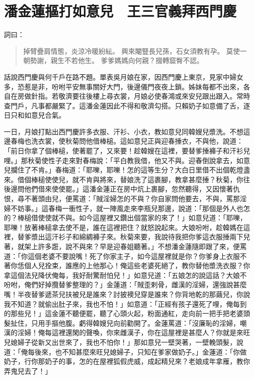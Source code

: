 
\chapter{潘金蓮摳打如意兒　王三官義拜西門慶}

詞曰：
\begin{quote}
掉臂疊肩情態，炎涼冷暖紛紜。
興來閹豎長兒孫，石女須教有孕。
莫使一朝勢謝，親生不若他生。
爹爹媽媽向何親？掇轉窟臀不認。
\end{quote}

話說西門慶與何千戶在路不題。單表吳月娘在家，因西門慶上東京，見家中婦女多，恐惹是非，吩咐平安無事關好大門，後邊儀門夜夜上鎖。姊妹每都不出來，各自在房做針指。若敬濟要往後樓上尋衣裳，月娘必使春鴻或來安兒跟出跟入。常時查門戶，凡事都嚴緊了。這潘金蓮因此不得和敬濟勾搭。只賴奶子如意備了舌，逐日只和如意兒合氣。

一日，月娘打點出西門慶許多衣服、汗衫、小衣，教如意兒同韓嫂兒漿洗。不想這邊春梅也洗衣裳，使秋菊問他借棒槌。這如意兒正與迎春捶衣，不與他，說道：「前日你拿了個棒槌，使著罷了，又來要！趁韓嫂在這裡，要替爹捶褲子和汗衫兒哩。」那秋菊使性子走來對春梅說：「平白教我借，他又不與。迎春倒說拿去，如意兒攔住了不肯。」春梅道：「耶嚛，耶嚛！怎的這等生分？大白日里借不出個乾燈盞來。借個棒槌使使兒，就不肯與將來，替娘洗了這裹腳，教拿甚麼捶？秋菊，你往後邊問他們借來使使罷。」這潘金蓮正在房中炕上裹腳，忽然聽得，又因懷著仇恨，尋不著頭由兒，便罵道：「賊淫婦怎的不與？你自家問他要去，不與，罵那淫婦不妨事。」這春梅一衝性子，就一陣風走來李瓶兒那邊，說道：「那個是外人也怎的？棒槌借使使就不與。如今這屋裡又鑽出個當家的來了！」如意兒道：「耶嚛，耶嚛！放著棒槌拿去使不是，誰在這裡把住？就怒說起來。大娘吩咐，趁韓媽在這裡，替爹漿出這汗衫子和綿綢褲子來。秋菊來要，我說待我把你爹這衣服捶兩下兒著，就架上許多誑，說不與來？早是迎春姐聽著。」不想潘金蓮隨即跟了來，便罵道：「你這個老婆不要說嘴！死了你家主子，如今這屋裡就是你？你爹身上衣服不著你恁個人兒拴束，誰應的上他那心！俺這些老婆死絕了，教你替他漿洗衣服？你拿這個法兒降伏俺每，我好耐驚耐怕兒！」如意兒道：「五娘怎的說這話？大娘不吩咐，俺們好掉攬替爹整理的？」金蓮道：「賊歪剌骨，雌漢的淫婦，還強說甚麼嘴！半夜替爹遞茶兒扶被兒是誰來？討披襖兒穿是誰來？你背地乾的那繭兒，你說我不知道？就偷出肚子來，我也不怕！」如意道：「正經有孩子還死了哩，俺每到的那些兒！」這金蓮不聽便罷，聽了心頭火起，粉面通紅，走向前一把手把老婆頭髮扯住，只用手摳他腹。虧得韓嫂兒向前勸開了。金蓮罵道：「沒廉恥的淫婦，嘲漢的淫婦！俺每這裡還閑的聲喚，你來雌漢子，你在這屋裡是甚麼人？你就是來旺兒媳婦子從新又出世來了，我也不怕你！」那如意兒一壁哭著，一壁輓頭髮，說道：「俺每後來，也不知甚麼來旺兒媳婦子，只知在爹家做奶子。」金蓮道：「你做奶子，行你那奶子的事，怎的在屋裡狐假虎威，成起精兒來？老娘成年拿雁，教你弄鬼兒去了！」

